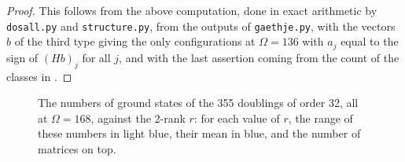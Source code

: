 \documentclass[11pt,a4paper]{article}
\theoremstyle{remark}
\begin{document}
\begin{proof}
This follows from the above computation, done in exact arithmetic by \texttt{dosall.py} and \texttt{structure.py}, from the outputs of \texttt{gaethje.py}, with the vectors $b$ of the third type giving the only configurations at $\Omega=136$ with $a_j$ equal to the sign of $(Hb)_j$ for all $j$, and with the last assertion coming from the count of the classes in \cite{wls}.
\end{proof}

\medskip

\begin{figure}[htb!]
\centering
{}
\caption{The numbers of ground states of the 355 doublings of order 32, all at $\Omega=168$, against the 2-rank $r$: for each value of $r$, the range of these numbers in light blue, their mean in blue, and the number of matrices on top.}\label{fig:order32gs}
\end{figure}
\end{document}
